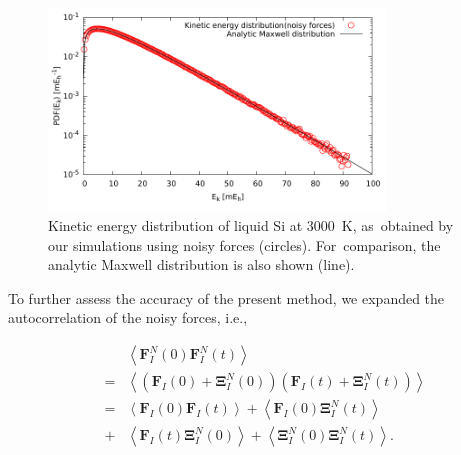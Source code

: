 \documentclass[computation,article,accept,moreauthors,pdftex]{Definitions/mdpi}
\begin{document}
\begin{figure}[H]
\begin{center}
\includegraphics[width=0.8\textwidth]
{maxwelldistribution_new.pdf}
\end{center}
\caption{\label{Fig3}
Kinetic energy distribution of liquid Si at 3000~K, as~obtained by our simulations using noisy forces (circles). For~comparison, the analytic Maxwell distribution is also shown (line).
} \end{figure}
To further assess the accuracy of the present method, we expanded the autocorrelation of the noisy forces, i.e.,

\begin{subequations}
\begin{eqnarray}
 && \left \langle \textbf{F}_{I}^{N}\left ( 0 \right )\textbf{F}_{I}^{N}\left ( t \right )\right \rangle \\
 &=& \left \langle \left ( \textbf{F}_{I}\left ( 0 \right ) + \mathbf{\Xi } _{I}^{N} \left(0 \right )\right) \left( \textbf{F}_{I}\left ( t \right )+\mathbf{\Xi } _{I}^{N}\left ( t \right )\right) \right \rangle \\
 &=& \left \langle \textbf{F}_{I}\left ( 0 \right ) \textbf{F}_{I}\left ( t \right )\right \rangle + \left \langle \textbf{F}_{I}\left ( 0 \right ) \mathbf{\Xi } _{I}^{N}\left(t \right )\right \rangle \label{AutoCorr} \\
 &+& \left \langle \textbf{F}_{I}\left ( t \right ) \mathbf{\Xi } _{I}^{N}\left(0 \right )\right \rangle + \left \langle \mathbf{\Xi } _{I}^{N}\left(0 \right ) \mathbf{\Xi } _{I}^{N}\left(t \right )\right \rangle. \nonumber
\end{eqnarray}
\end{subequations}
\end{document}
